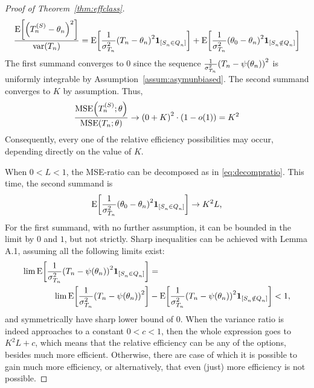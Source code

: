 \documentclass[ejs, twoside]{imsart}
\theoremstyle{plain}
\theoremstyle{remark}
\newcommand{\fullstop}{\text{.}}
\newcommand{\comma}{\text{,}}
\newcommand{\MSE}{\operatorname{MSE}}
\numberwithin{equation}{section}
\numberwithin{table}{section}
\numberwithin{figure}{section}
\let\originalleft\left
\let\originalright\right
\renewcommand{\left}{\mathopen{}\mathclose\bgroup\originalleft}
\renewcommand{\right}{\aftergroup\egroup\originalright}
\begin{document}
\begin{appendix}
\begin{proof}[Proof of Theorem~\ref{thm:effclass}]
	\begin{equation} \label{eq:decompratio}
		\frac{\mean{\left(  \estimfil - \theta_n \right)^2 } }{\var{\estimreg}} =
		\mean{\frac{1}{\sigma_{\estimreg}^2} \left( \estimreg - \theta_n \right)^2 \indc{\nfilevent[][n]} }+\mean{\frac{1}{\sigma_{\estimreg}^2} \left( \theta_0 - \theta_n \right)^2 \indc{\filevent[][n]} }
	\end{equation}
	The first summand converges to \(0\) since the sequence \(\frac{1}{\sigma_{\estimreg}^2}\left(\estimreg - \psi\left(\theta_n\right) \right)^2\) is uniformly integrable by Assumption~\ref{assum:asymunbiased}. The second summand converges to \(K\) by assumption. Thus,
	\begin{align}
		\frac{\MSE\left(\estimfil; \theta\right) }{\MSE\left(\estimreg; \theta\right)} \to \left( 0 + K\right) ^2 \cdot \left(1-o\left(1 \right)  \right) = K^2
	\end{align}
	Consequently, every one of the relative efficiency possibilities may occur, depending directly on the value of \(K\).
	
	
	
	
	When \(0<L<1\), the MSE-ratio can be decomposed as in \eqref{eq:decompratio}. This time, the second summand is
	\[\mean{\frac{1}{\sigma_{\estimreg}^2} \left( \theta_0 - \theta_n \right)^2 \indc{\nfilevent[][n]} } \to K^2 L\comma\]
	For the first summand,
	with no further assumption, it can be bounded in the limit by \(0\) and \(1\), but not strictly. Sharp inequalities can be achieved with Lemma A.1, assuming all the following limits exist:
	\begin{align*}
	    \lim \mean{\frac{1}{\sigma_{\estimreg}^2}\left(\estimreg - \psi\left(\theta_n\right) \right)^2 \indc{\nfilevent[][n]} } &=\\ \lim \mean{\frac{1}{\sigma_{\estimreg}^2}\left(\estimreg - \psi\left(\theta_n\right) \right)^2 } &- \mean{\frac{1}{\sigma_{\estimreg}^2}\left(\estimreg - \psi\left(\theta_n\right) \right)^2 \indc{\filevent[][n]} } < 1 \comma
	\end{align*}
	and symmetrically have sharp lower bound of \(0\).
	When the variance ratio is indeed approaches to a constant \(0<c<1\), then the whole expression goes to \(K^2 L+c\), which means that the relative efficiency can be any of the options, besides much more efficient. Otherwise, there are case of which it is possible to gain much more efficiency, or alternatively, that even (just) more efficiency is not possible.
	

\end{proof}
\end{appendix}
\end{document}
